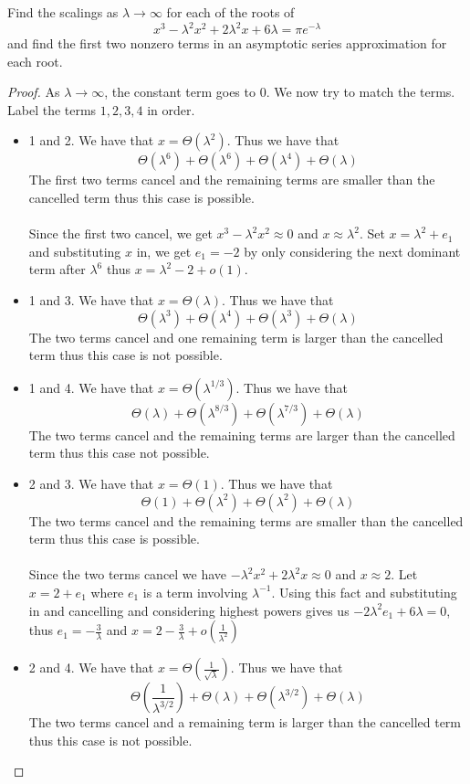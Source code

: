 \documentclass[a4paper]{article}
\begin{document}
\begin{eg}{}{} Find the scalings as $\lambda\to\infty$ for each of the roots of $$x^3-\lambda^2x^2+2\lambda^2x+6\lambda=\pi e^{-\lambda}$$ and find the first two nonzero terms in an asymptotic series approximation for each root. \tcbline
\begin{proof}
As $\lambda\to\infty$, the constant term goes to $0$. We now try to match the terms. Label the terms $1,2,3,4$ in order. 
\begin{itemize}
\item 1 and 2. We have that $x=\Theta(\lambda^2)$. Thus we have that $$\Theta(\lambda^6)+\Theta(\lambda^6)+\Theta(\lambda^4)+\Theta(\lambda)$$ The first two terms cancel and the remaining terms are smaller than the cancelled term thus this case is possible. \\~\\
Since the first two cancel, we get $x^3-\lambda^2x^2\approx0$ and $x\approx\lambda^2$. Set $x=\lambda^2+e_1$ and substituting $x$ in, we get $e_1=-2$ by only considering the next dominant term after $\lambda^6$ thus $x=\lambda^2-2+o(1)$. 
\item 1 and 3. We have that $x=\Theta(\lambda)$. Thus we have that $$\Theta(\lambda^3)+\Theta(\lambda^4)+\Theta(\lambda^3)+\Theta(\lambda)$$ The two terms cancel and one remaining term is larger than the cancelled term thus this case is not possible. 
\item 1 and 4. We have that $x=\Theta(\lambda^{1/3})$. Thus we have that $$\Theta(\lambda)+\Theta(\lambda^{8/3})+\Theta(\lambda^{7/3})+\Theta(\lambda)$$ The two terms cancel and the remaining terms are larger than the cancelled term thus this case not possible. 
\item 2 and 3. We have that $x=\Theta(1)$. Thus we have that $$\Theta(1)+\Theta(\lambda^2)+\Theta(\lambda^2)+\Theta(\lambda)$$ The two terms cancel and the remaining terms are smaller than the cancelled term thus this case is possible.\\~\\
Since the two terms cancel we have $-\lambda^2x^2+2\lambda^2x\approx0$ and $x\approx 2$. Let $x=2+e_1$ where $e_1$ is a term involving $\lambda^{-1}$. Using this fact and substituting in and cancelling and considering highest powers gives us $-2\lambda^2e_1+6\lambda=0$, thus $e_1=-\frac{3}{\lambda}$ and $x=2-\frac{3}{\lambda}+o\left(\frac{1}{\lambda^2}\right)$
\item 2 and 4. We have that $x=\Theta\left(\frac{1}{\sqrt{\lambda}}\right)$. Thus we have that $$\Theta\left(\frac{1}{\lambda^{3/2}}\right)+\Theta(\lambda)+\Theta(\lambda^{3/2})+\Theta(\lambda)$$ The two terms cancel and a remaining term is larger than the cancelled term thus this case is not possible. 

\end{itemize}
\end{proof}
\end{eg}
\end{document}

